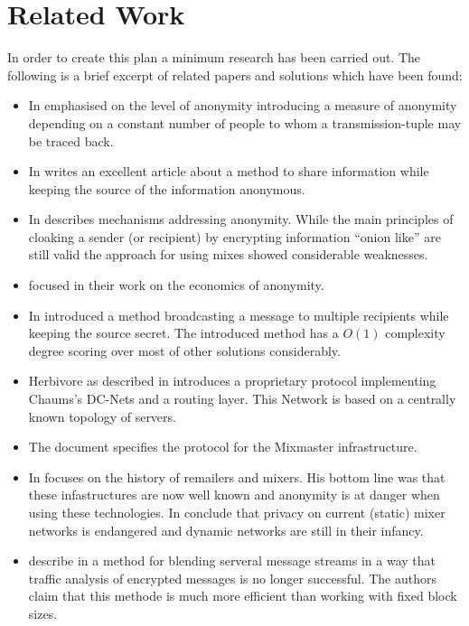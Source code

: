 \documentclass[twocolumn,a4paper,10pt,english]{article}
\begin{document}
\section{Related Work}
In order to create this plan a minimum research has been carried out. The following is a brief excerpt of related papers and solutions which have been found:
\begin{itemize}
\item In \cite{k-anonymous:ccs2003} \citeauthor{k-anonymous:ccs2003} emphasised on the level of anonymity introducing a measure of anonymity depending on a constant number of people to whom a transmission-tuple may be traced back.
\item In \citeyear{chaum-dc} \citeauthor{chaum-dc} writes an excellent article\cite{chaum-dc} about a method to share information while keeping the source of the information anonymous.
\item In \cite{chaum-mix} \citeauthor{chaum-mix} describes mechanisms addressing anonymity. While the main principles of cloaking a sender (or recipient) by encrypting information ``onion like'' are still valid the approach for using mixes showed considerable weaknesses.
\item \citeauthor{danezis:weis2006} focused in their work \cite{danezis:weis2006} on the economics of anonymity.
\item In \cite{xor-trees} \citeauthor{xor-trees} introduced a method broadcasting a message to multiple recipients while keeping the source secret. The introduced method has a $O(1)$ complexity degree scoring over most of other solutions considerably.
\item Herbivore as described in \cite{herbivore:tr} introduces a proprietary protocol implementing Chaums's DC-Nets and a routing layer. This Network is based on a centrally known topology of servers.
\item The document \cite{mixmaster-spec} specifies the protocol for the Mixmaster infrastructure.
\item In \cite{remailer-history} \citeauthor{remailer-history} focuses on the history of remailers and mixers. His bottom line was that these infastructures are now well known and anonymity is at danger when using these technologies. In \cite{RP03-1} \citeauthor{RP03-1} conclude that privacy on current (static) mixer networks is endangered and dynamic networks are still in their infancy.
\item \citeauthor{morphmix:wpes2002} describe in \cite{morphmix:wpes2002} a method for blending serveral message streams in a way that traffic analysis of encrypted messages is no longer successful. The authors claim that this methode is much more efficient than working with fixed block sizes.

\end{itemize}
\end{document}
